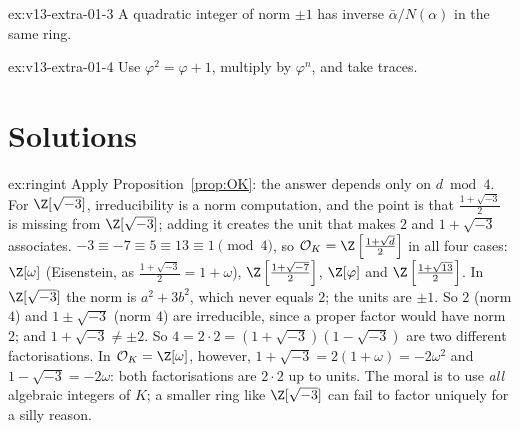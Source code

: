 \begin{hint}{ex:v13-extra-01-3}
A quadratic integer of norm $\pm1$ has inverse $\bar\alpha/N(\alpha)$ in the same ring.
\end{hint}

\begin{hint}{ex:v13-extra-01-4}
Use $\varphi^2=\varphi+1$, multiply by $\varphi^n$, and take traces.
\end{hint}

\section{Solutions}

\begin{solution}{ex:ringint}
\idea Apply Proposition~\ref{prop:OK}: the answer depends only on $d\bmod4$. For $\Z[\sqrt{-3}]$, irreducibility is a norm computation, and the point is that $\frac{1+\sqrt{-3}}2$ is missing from $\Z[\sqrt{-3}]$; adding it creates the unit that makes $2$ and $1+\sqrt{-3}$ associates.
\writeup $-3\equiv-7\equiv5\equiv13\equiv1\pmod4$, so $\mathcal O_K=\Z\left[\frac{1+\sqrt d}2\right]$ in all four cases: $\Z[\omega]$ (Eisenstein, as $\frac{1+\sqrt{-3}}2=1+\omega$), $\Z\left[\frac{1+\sqrt{-7}}2\right]$, $\Z[\varphi]$ and $\Z\left[\frac{1+\sqrt{13}}2\right]$. In $\Z[\sqrt{-3}]$ the norm is $a^2+3b^2$, which never equals $2$; the units are $\pm1$. So $2$ (norm $4$) and $1\pm\sqrt{-3}$ (norm $4$) are irreducible, since a proper factor would have norm $2$; and $1+\sqrt{-3}\ne\pm2$. So $4=2\cdot2=(1+\sqrt{-3})(1-\sqrt{-3})$ are two different factorisations. In $\mathcal O_K=\Z[\omega]$, however, $1+\sqrt{-3}=2(1+\omega)=-2\omega^2$ and $1-\sqrt{-3}=-2\omega$: both factorisations are $2\cdot2$ up to units. The moral is to use \emph{all} algebraic integers of $K$; a smaller ring like $\Z[\sqrt{-3}]$ can fail to factor uniquely for a silly reason.
\end{solution}

